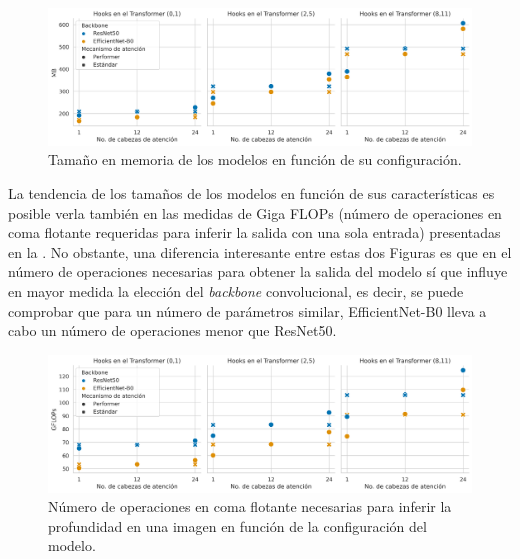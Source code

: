 \begin{figure}[H]
\centering
\includegraphics[width=\linewidth]{imagenes/Resultados/mb.png} 
\captionsetup{width=0.95\linewidth}
\caption{Tamaño en memoria de los modelos en función de su configuración.}
\label{fig:resultados-mb}
\end{figure}

La tendencia de los tamaños de los modelos en función de sus características es posible verla también en las medidas de Giga FLOPs (número de operaciones en coma flotante requeridas para inferir la salida con una sola entrada) presentadas en la . No obstante, una diferencia interesante entre estas dos Figuras es que en el número de operaciones necesarias para obtener la salida del modelo sí que influye en mayor medida la elección del \textit{backbone} convolucional, es decir, se puede comprobar que para un número de parámetros similar, EfficientNet-B0 lleva a cabo un número de operaciones menor que ResNet50.

\begin{figure}[H]
\centering
\includegraphics[width=\linewidth]{imagenes/Resultados/gflops.png} 
\captionsetup{width=.95\linewidth}
\caption{Número de operaciones en coma flotante necesarias para inferir la profundidad en una imagen en función de la configuración del modelo.}
\label{fig:resultados-gflops}
\end{figure}















